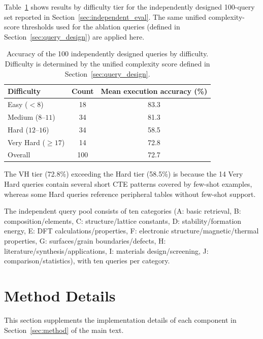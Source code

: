 \label{sec:sup_expert_queries}

Table~\ref{tab:sup_expert_summary} shows results by difficulty tier for the independently designed 100-query set reported in Section~\ref{sec:independent_eval}. The same unified complexity-score thresholds used for the ablation queries (defined in Section~\ref{sec:query_design}) are applied here.

\begin{table}[htbp]
  \centering
  \caption{Accuracy of the 100 independently designed queries by difficulty. Difficulty is determined by the unified complexity score defined in Section~\ref{sec:query_design}.}

  \label{tab:sup_expert_summary}
  \small
  \begin{tabular}{lcc}
    \toprule
    Difficulty & Count & Mean execution accuracy (\%) \\
    \midrule
    Easy ($< 8$) & 18 & 83.3 \\
    Medium ($8$--$11$) & 34 & 81.3 \\
    Hard ($12$--$16$) & 34 & 58.5 \\
    Very Hard ($\geq 17$) & 14 & 72.8 \\
    \midrule
    Overall & 100 & 72.7 \\
    \bottomrule
  \end{tabular}
\end{table}

The VH tier (72.8\%) exceeding the Hard tier (58.5\%) is because the 14 Very Hard queries contain several short CTE patterns covered by few-shot examples, whereas some Hard queries reference peripheral tables without few-shot support.

The independent query pool consists of ten categories (A: basic retrieval, B: composition/elements, C: structure/lattice constants, D: stability/formation energy, E: DFT calculations/properties, F: electronic structure/magnetic/thermal properties, G: surfaces/grain boundaries/defects, H: literature/synthesis/applications, I: materials design/screening, J: comparison/statistics), with ten queries per category.

\section{Method Details}
\label{sec:sup_method_details}

This section supplements the implementation details of each component in Section~\ref{sec:method} of the main text.

